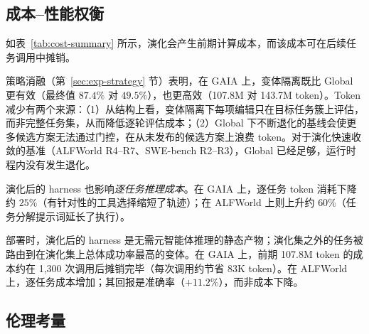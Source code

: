 \subsection{成本--性能权衡}

如表~\ref{tab:cost-summary} 所示，演化会产生前期计算成本，而该成本可在后续任务调用中摊销。

\begin{table}[!htbp]
\centering
\small
\caption{演化成本汇总。所有主要实验使用 Global（单一 harness）策略；变体隔离一行来自策略消融（第~\ref{sec:exp-strategy} 节）。}
\label{tab:cost-summary}
\end{table}

策略消融（第~\ref{sec:exp-strategy} 节）表明，在 GAIA 上，变体隔离既比 Global 更有效（最终值 $87.4\%$ 对 $49.5\%$），也更高效（107.8M 对 143.7M token）。Token 减少有两个来源：（1）从结构上看，变体隔离下每项编辑只在目标任务簇上评估，而非完整任务集，从而降低逐轮评估成本；（2）Global 下不断退化的基线会使更多候选方案无法通过门控，在从未发布的候选方案上浪费 token。对于演化快速收敛的基准（ALFWorld R4--R7、SWE-bench R2--R3），Global 已经足够，运行时程内没有发生退化。

演化后的 harness 也影响\textit{逐任务推理成本}。在 GAIA 上，逐任务 token 消耗下降约 $25\%$（有针对性的工具选择缩短了轨迹）；在 ALFWorld 上则上升约 $60\%$（任务分解提示词延长了执行）。

部署时，演化后的 harness 是无需元智能体推理的静态产物；演化集之外的任务被路由到在演化集上总体成功率最高的变体。在 GAIA 上，前期 107.8M token 的成本约在 1,300 次调用后摊销完毕（每次调用约节省 83K token）。在 ALFWorld 上，逐任务成本增加；其回报是准确率（$+11.2\%$），而非成本下降。

\subsection{伦理考量}


